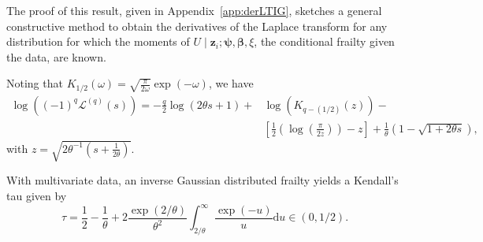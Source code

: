 The proof of this result, given in Appendix~\ref{app:derLTIG},
  sketches a general constructive method to obtain the derivatives of the Laplace transform
  for any distribution for which the moments of 
  $U \mid \bm z_i; \bm\psi, \bm\beta, \xi$, 
  the conditional frailty given the data, 
  are known.
  
Noting that $K_{1 \slash 2} ( \omega ) = \sqrt{\frac{\pi}{2 \omega}} \exp(- \omega)$, we have
\begin{align}
\log \left( ( - 1 )^{q} \mathcal{L}^{( q )} ( s ) \right) = - \frac{q}{2} \log ( 2 \theta s + 1) +  & \log \left( K_{q - (1 \slash 2)} ( z ) \right) -  \nonumber \\
	& \left[ \frac{1}{2} \left( \log \left( \frac{\pi}{2 z} \right) \right) - z \right]
	+ \frac{1}{\theta} \left( 1 - \sqrt{1 + 2 \theta s} \right),
\label{eqn:ingau}
\end{align}
with $z = \sqrt{ 2 \theta^{-1} ( s + \tfrac{1}{2 \theta} ) }$.

With multivariate data, an inverse Gaussian distributed frailty yields a Kendall's tau given by
\begin{equation*}
  \tau = \frac12 - \frac1\theta + 2 \frac{\exp(2/\theta)}{\theta^2}
          \int_{2 / \theta}^\infty \frac{\exp(-u)}u \mathrm d u
  \in (0, 1/2).
\end{equation*}
